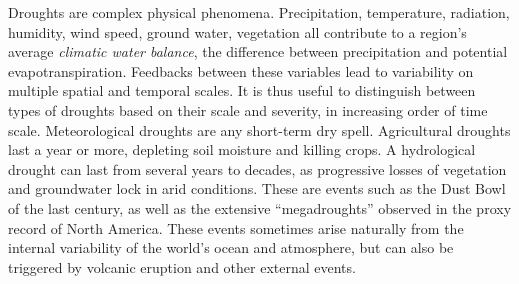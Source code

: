 \documentclass[fleqn,10pt]{wlscirep}
\begin{document}
Droughts are complex physical phenomena. Precipitation, temperature, radiation, humidity, wind speed, ground water, vegetation all contribute to a region's average \textit{climatic water balance}, the difference between precipitation and potential evapotranspiration. Feedbacks between these variables lead to variability on multiple spatial and temporal scales. It is thus useful to distinguish between types of droughts based on their scale and severity, in increasing order of time scale. Meteorological droughts are any short-term dry spell. Agricultural droughts last a year or more, depleting soil moisture and killing crops. A hydrological drought can last from several years to decades, as progressive losses of vegetation and groundwater lock in arid conditions. These are events such as the Dust Bowl of the last century, as well as the extensive ``megadroughts'' observed in the proxy record of North America. These events sometimes arise naturally from the internal variability of the world's ocean and atmosphere, but can also be triggered by volcanic eruption and other external events.

\end{document}
